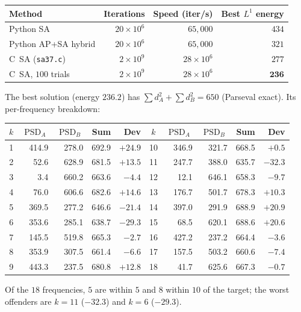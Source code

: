 \documentclass[11pt,a4paper]{article}
\newcommand{\PSD}{\operatorname{PSD}}
\theoremstyle{plain}
\theoremstyle{definition}
\theoremstyle{remark}
\begin{document}
\begin{center}
\begin{tabular}{lrrr}
\toprule
Method & Iterations & Speed (iter/s) & Best $L^1$ energy \\
\midrule
Python SA & $20\times10^6$ & $65{,}000$ & $434$ \\
Python AP+SA hybrid & $20\times10^6$ & $65{,}000$ & $321$ \\
C~SA (\texttt{sa37.c}) & $2\times10^9$ & $28\times10^6$ & $277$ \\
C~SA, $100$ trials & $2\times10^9$ & $28\times10^6$ & $\mathbf{236}$ \\
\bottomrule
\end{tabular}
\end{center}

The best solution (energy $236.2$) has $\sum d_A^2+\sum d_B^2=650$ (Parseval exact). Its per-frequency breakdown:

\begin{center}
\small
\begin{tabular}{crrrr|crrrr}
\toprule
$k$ & $\PSD_A$ & $\PSD_B$ & Sum & Dev & $k$ & $\PSD_A$ & $\PSD_B$ & Sum & Dev \\
\midrule
1 & 414.9 & 278.0 & 692.9 & $+24.9$ & 10 & 346.9 & 321.7 & 668.5 & $+0.5$ \\
2 & 52.6 & 628.9 & 681.5 & $+13.5$ & 11 & 247.7 & 388.0 & 635.7 & $-32.3$ \\
3 & 3.4 & 660.2 & 663.6 & $-4.4$ & 12 & 12.1 & 646.1 & 658.3 & $-9.7$ \\
4 & 76.0 & 606.6 & 682.6 & $+14.6$ & 13 & 176.7 & 501.7 & 678.3 & $+10.3$ \\
5 & 369.5 & 277.2 & 646.6 & $-21.4$ & 14 & 397.0 & 291.9 & 688.9 & $+20.9$ \\
6 & 353.6 & 285.1 & 638.7 & $-29.3$ & 15 & 68.5 & 620.1 & 688.6 & $+20.6$ \\
7 & 145.5 & 519.8 & 665.3 & $-2.7$ & 16 & 427.2 & 237.2 & 664.4 & $-3.6$ \\
8 & 353.9 & 307.5 & 661.4 & $-6.6$ & 17 & 157.5 & 503.2 & 660.6 & $-7.4$ \\
9 & 443.3 & 237.5 & 680.8 & $+12.8$ & 18 & 41.7 & 625.6 & 667.3 & $-0.7$ \\
\bottomrule
\end{tabular}
\end{center}
Of the $18$ frequencies, $5$ are within $5$ and $8$ within $10$ of the target; the worst offenders are $k=11$ ($-32.3$) and $k=6$ ($-29.3$).
\end{document}
